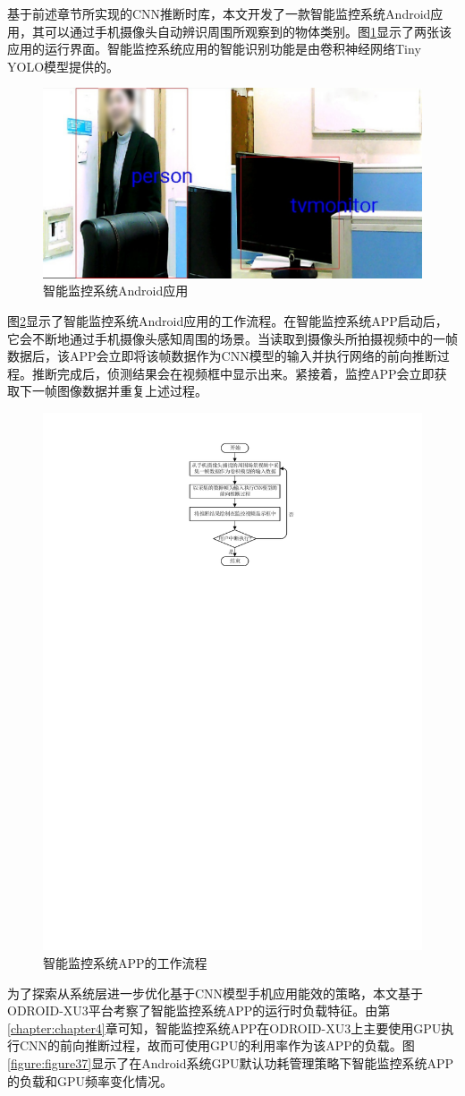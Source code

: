 基于前述章节所实现的CNN推断时库，本文开发了一款智能监控系统Android应用，其可以通过手机摄像头自动辨识周围所观察到的物体类别。图\ref{figure:figure31}显示了两张该应用的运行界面。智能监控系统应用的智能识别功能是由卷积神经网络Tiny YOLO\cite{pjreddie.com}模型提供的。

\begin{figure}[htbp]
    \centering
    \includegraphics[height=0.4\textwidth]{figures/app.pdf}
    \caption{智能监控系统Android应用}\label{figure:figure31}
\end{figure}

图\ref{figure:figure36}显示了智能监控系统Android应用的工作流程。在智能监控系统APP启动后，它会不断地通过手机摄像头感知周围的场景。当读取到摄像头所拍摄视频中的一帧数据后，该APP会立即将该帧数据作为CNN模型的输入并执行网络的前向推断过程。推断完成后，侦测结果会在视频框中显示出来。紧接着，监控APP会立即获取下一帧图像数据并重复上述过程。

\begin{figure}[htbp]
    \centering
    \includegraphics[height=0.5\textwidth]{figures/app_process.pdf}
    \caption{智能监控系统APP的工作流程}\label{figure:figure36}
\end{figure}

为了探索从系统层进一步优化基于CNN模型手机应用能效的策略，本文基于ODROID-XU3平台考察了智能监控系统APP的运行时负载特征。由第\ref{chapter:chapter4}章可知，智能监控系统APP在ODROID-XU3上主要使用GPU执行CNN的前向推断过程，故而可使用GPU的利用率作为该APP的负载。图\ref{figure:figure37}显示了在Android系统GPU默认功耗管理策略下智能监控系统APP的负载和GPU频率变化情况。

